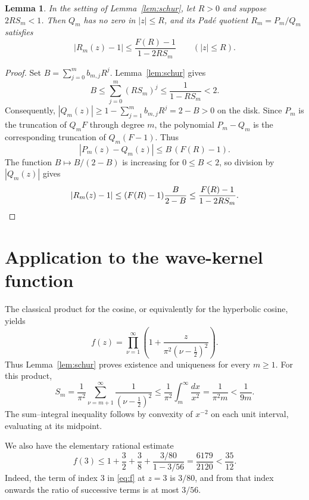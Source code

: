 \documentclass[11pt]{article}
\newtheorem{lemma}[theorem]{Lemma}
\theoremstyle{remark}\newtheorem{remark}[theorem]{Remark}
\begin{document}
\begin{lemma}\label{lem:disk}
In the setting of Lemma~\ref{lem:schur}, let $R>0$ and suppose $2RS_m<1$. Then $Q_m$ has no zero in $|z|\leq R$, and its Pad\'e quotient $R_m=P_m/Q_m$ satisfies
\begin{equation}\label{eq:generalbound}
|R_m(z)-1|\leq \frac{F(R)-1}{1-2RS_m}\qquad(|z|\leq R).
\end{equation}
\end{lemma}
\begin{proof}
Set $B=\sum_{j=0}^m b_{m,j}R^j$. Lemma~\ref{lem:schur} gives
\[
B\leq\sum_{j=0}^m(RS_m)^j\leq\frac{1}{1-RS_m}<2.
\]
Consequently, $|Q_m(z)|\geq1-\sum_{j=1}^m b_{m,j}R^j=2-B>0$ on the disk. Since $P_m$ is the truncation of $Q_mF$ through degree $m$, the polynomial $P_m-Q_m$ is the corresponding truncation of $Q_m(F-1)$. Thus
\[
|P_m(z)-Q_m(z)|\leq B\,(F(R)-1).
\]
The function $B\mapsto B/(2-B)$ is increasing for $0\leq B<2$, so division by $|Q_m(z)|$ gives
\[
|R_m(z)-1|\leq (F(R)-1)\frac{B}{2-B}
\leq\frac{F(R)-1}{1-2RS_m}.
\qedhere
\]
\end{proof}

\section{Application to the wave-kernel function}
The classical product for the cosine, or equivalently for the hyperbolic cosine, yields
\begin{equation}\label{eq:product}
f(z)=\prod_{\nu=1}^{\infty}\left(1+\frac{z}{\pi^2(\nu-\tfrac12)^2}\right).
\end{equation}
Thus Lemma~\ref{lem:schur} proves existence and uniqueness for every $m\geq1$. For this product,
\begin{equation}\label{eq:sm}
S_m=\frac{1}{\pi^2}\sum_{\nu=m+1}^{\infty}\frac{1}{(\nu-\tfrac12)^2}
\leq\frac{1}{\pi^2}\int_m^{\infty}\frac{dx}{x^2}
=\frac{1}{\pi^2m}<\frac{1}{9m}.
\end{equation}
The sum--integral inequality follows by convexity of $x^{-2}$ on each unit interval, evaluating at its midpoint.

We also have the elementary rational estimate
\begin{equation}\label{eq:coshbound}
f(3)\leq 1+\frac32+\frac38+\frac{3/80}{1-3/56}
=\frac{6179}{2120}<\frac{35}{12}.
\end{equation}
Indeed, the term of index $3$ in \eqref{eq:f} at $z=3$ is $3/80$, and from that index onwards the ratio of successive terms is at most $3/56$.
\end{document}
